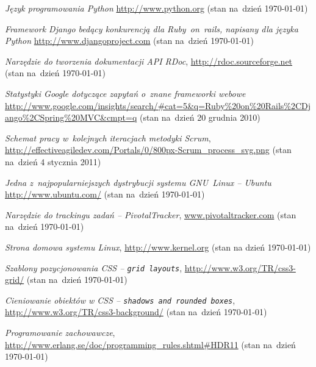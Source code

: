 \begin{thebibliography}{99}
   \emph{Język programowania Python} \url{http://www.python.org} (stan na~dzień \today)

   \emph{Framework Django bedący konkurencją dla Ruby~on~rails, napisany dla języka Python} \url{http://www.djangoproject.com} (stan na~dzień \today)

   \emph{Narzędzie do tworzenia dokumentacji API RDoc}, \url{http://rdoc.sourceforge.net} (stan na~dzień \today)

   \emph{Statystyki Google dotyczące zapytań o~znane frameworki webowe} \url{http://www.google.com/insights/search/\#cat=5\&q=Ruby\%20on\%20Rails\%2CDjango\%2CSpring\%20MVC\&cmpt=q} (stan na~dzień 20 grudnia 2010)

   \emph{Schemat pracy w~kolejnych iteracjach metodyki Scrum}, \url{http://effectiveagiledev.com/Portals/0/800px-Scrum\_process\_svg.png} (stan na~dzień 4 stycznia 2011)

   \emph{Jedna z~najpopularniejszych dystrybucji systemu GNU~Linux -- Ubuntu} \url{http://www.ubuntu.com/} (stan na~dzień \today)

   \emph{Narzędzie do trackingu zadań -- PivotalTracker}, \url{www.pivotaltracker.com} (stan na~dzień \today)

   \emph{Strona domowa systemu Linux}, \url{http://www.kernel.org} (stan na dzień \today)

   \emph{Szablony pozycjonowania CSS -- \texttt{grid layouts}}, \url{http://www.w3.org/TR/css3-grid/} (stan na~dzień \today)

   \emph{Cieniowanie obiektów w CSS -- \texttt{shadows and rounded boxes}}, \url{http://www.w3.org/TR/css3-background/} (stan na~dzień \today)

   \emph{Programowanie zachowawcze}, \url{http://www.erlang.se/doc/programming\_rules.shtml\#HDR11} (stan na~dzień \today)

\end{thebibliography}
